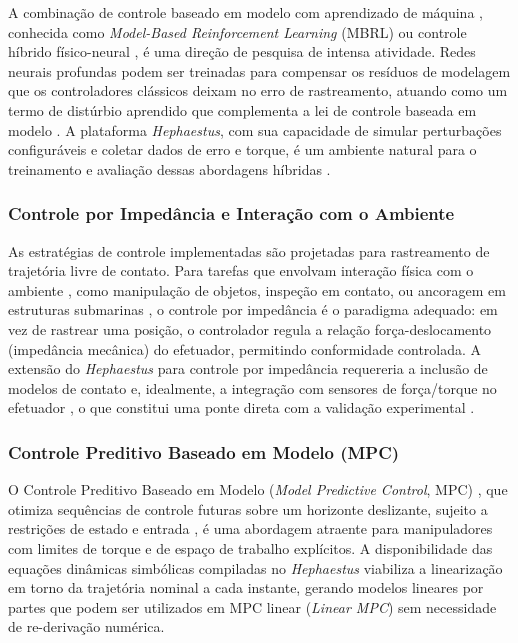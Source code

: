 A combinação de controle baseado em modelo com aprendizado de máquina , conhecida como \textit{Model-Based Reinforcement Learning} (MBRL) \cite{khalil2002nonlinear} ou controle híbrido físico-neural , é uma direção de pesquisa de intensa atividade. Redes neurais profundas podem ser treinadas para compensar os resíduos de modelagem que os controladores clássicos deixam no erro de rastreamento, atuando como um termo de distúrbio aprendido que complementa a lei de controle baseada em modelo \cite{isidori1985nonlinear}. A plataforma \textit{Hephaestus}, com sua capacidade de simular perturbações configuráveis e coletar dados de erro e torque, é um ambiente natural para o treinamento e avaliação dessas abordagens híbridas \cite{corke2021toolbox}.

\subsubsection*{Controle por Impedância e Interação com o Ambiente}

As estratégias de controle implementadas são projetadas para rastreamento de trajetória livre de contato. Para tarefas que envolvam interação física com o ambiente , como manipulação de objetos, inspeção em contato, ou ancoragem em estruturas submarinas , o controle por impedância \cite{siciliano2009robotics, spong2020robot} é o paradigma adequado: em vez de rastrear uma posição, o controlador regula a relação força-deslocamento (impedância mecânica) do efetuador, permitindo conformidade controlada. A extensão do \textit{Hephaestus} para controle por impedância requereria a inclusão de modelos de contato \cite{khalil2002nonlinear} e, idealmente, a integração com sensores de força/torque no efetuador , o que constitui uma ponte direta com a validação experimental \cite{antonelli2014modelling}.

\subsubsection*{Controle Preditivo Baseado em Modelo (MPC)}

O Controle Preditivo Baseado em Modelo (\textit{Model Predictive Control}, MPC) \cite{astrom1995theory} , que otimiza sequências de controle futuras sobre um horizonte deslizante, sujeito a restrições de estado e entrada , é uma abordagem atraente para manipuladores com limites de torque e de espaço de trabalho explícitos. A disponibilidade das equações dinâmicas simbólicas compiladas no \textit{Hephaestus} viabiliza a linearização em torno da trajetória nominal a cada instante, gerando modelos lineares por partes que podem ser utilizados em MPC linear (\textit{Linear MPC}) \cite{ogata2010modern} sem necessidade de re-derivação numérica.


